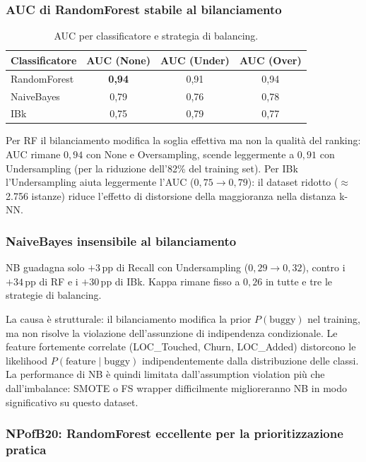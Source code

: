 \subsubsection{AUC di RandomForest stabile al bilanciamento}

\begin{table}[h!]
\centering
\small
\begin{tabular}{@{}lccc@{}}
\toprule
\textbf{Classificatore} & \textbf{AUC (None)} & \textbf{AUC (Under)} & \textbf{AUC (Over)} \\
\midrule
RandomForest & \textbf{0,94} & 0,91 & 0,94 \\
NaiveBayes   & 0,79          & 0,76 & 0,78 \\
IBk          & 0,75          & 0,79 & 0,77 \\
\bottomrule
\end{tabular}
\caption{AUC per classificatore e strategia di balancing.}
\end{table}

Per RF il bilanciamento modifica la soglia effettiva ma non la qualità del ranking: AUC
rimane $0{,}94$ con None e Oversampling, scende leggermente a $0{,}91$ con Undersampling
(per la riduzione dell'82\% del training set). Per IBk l'Undersampling aiuta leggermente
l'AUC ($0{,}75 \to 0{,}79$): il dataset ridotto ($\approx$2.756 istanze) riduce l'effetto
di distorsione della maggioranza nella distanza k-NN.

\subsubsection{NaiveBayes insensibile al bilanciamento}

NB guadagna solo $+3$\,pp di Recall con Undersampling ($0{,}29 \to 0{,}32$), contro i
$+34$\,pp di RF e i $+30$\,pp di IBk. Kappa rimane fisso a $0{,}26$ in tutte e tre le
strategie di balancing.

La causa è strutturale: il bilanciamento modifica la prior $P(\text{buggy})$ nel training,
ma non risolve la violazione dell'assunzione di indipendenza condizionale. Le feature
fortemente correlate (LOC\_Touched, Churn, LOC\_Added) distorcono le likelihood
$P(\text{feature} \mid \text{buggy})$ indipendentemente dalla distribuzione delle classi.
La performance di NB è quindi limitata dall'assumption violation più che dall'imbalance:
SMOTE o FS wrapper difficilmente miglioreranno NB in modo significativo su questo dataset.

\subsubsection{NPofB20: RandomForest eccellente per la prioritizzazione pratica}

